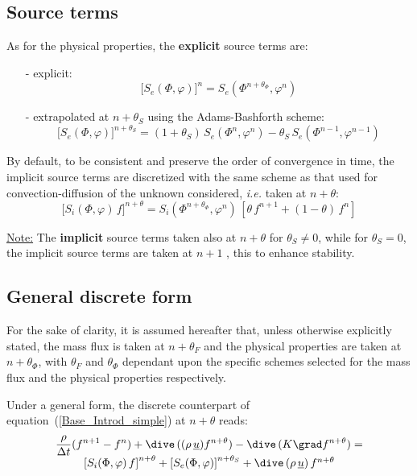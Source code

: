 \subsection*{Source terms}

As for the physical properties, the \textbf{explicit} source terms are:

\begin{itemize}
\item[-] explicit:
\begin{equation}
\lbrack S_{e}(\Phi ,\varphi )]^{n}=S_{e}(\Phi ^{n+\theta _{\Phi }},\varphi
^{n})
\end{equation}

\item[-] extrapolated at $n+\theta _{S}$ using the Adams-Bashforth scheme:
\begin{equation}
\lbrack S_{e}(\Phi ,\varphi )]^{n+\theta _{S}}=(1+\theta _{S})\,S_{e}(\Phi
^{n},\varphi ^{n})-\theta _{S}\,S_{e}(\Phi ^{n-1},\varphi ^{n-1})
\end{equation}
\end{itemize}

By default, to be consistent and preserve the order of convergence in time,
the implicit source terms are discretized with the same scheme as that used
for convection-diffusion of the unknown considered, \textit{i.e.} taken at $%
n+\theta $:
\begin{equation}
\lbrack S_{i}(\Phi ,\varphi )\,f]^{n+\theta }=S_{i}(\Phi ^{n+\theta _{\Phi
}},\varphi ^{n})\,[\theta \,f^{n+1}+(1-\theta )\,f^{n}]
\end{equation}

\underline{Note:}\newline
The \textbf{implicit} source terms taken also at $n+\theta $ for $\theta
_{S}\neq 0$, while for $\theta _{S}=0$, the implicit source terms are taken
at $n+1$ , this to enhance stability.

\subsection*{General discrete form}

For the sake of clarity, it is assumed hereafter that, unless otherwise
explicitly stated, the mass flux is taken at $n+\theta_F$ and the physical
properties are taken at $n+\theta_\Phi$, with $\theta_F$ and $\theta_\Phi$
dependant upon the specific schemes selected for the mass flux and the
physical properties respectively.

Under a general form, the discrete counterpart of equation~(\ref{Base_Introd_simple}) at
$n+\theta$ reads:
\begin{equation}
\begin{array}{c}
\displaystyle \frac{\rho}{\Delta t}(f^{n+1}-f^{n})+ \dive\,((\rho\,%
\underline{u}) f^{n+\theta})-\dive\,(K \grad f^{n+\theta}) = \\
\left[S_{i}(\Phi,\varphi)\,f\right]^{n+\theta} + \left[S_{e}(\Phi,\varphi)%
\right]^{n+\theta_{S}} + \dive\,(\rho\,\underline{u})\,f^{n+\theta}%
\end{array}%
\end{equation}

